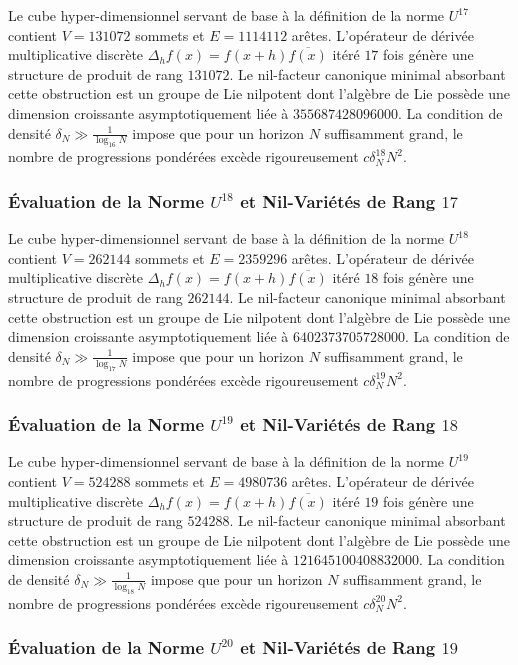 \documentclass[11pt,a4paper]{article}
\begin{document}
Le cube hyper-dimensionnel servant de base à la définition de la norme $U^{17}$ contient $V = 131072$ sommets et $E = 1114112$ arêtes. L'opérateur de dérivée multiplicative discrète $\Delta_h f(x) = f(x+h)\overline{f(x)}$ itéré $17$ fois génère une structure de produit de rang $131072$. Le nil-facteur canonique minimal absorbant cette obstruction est un groupe de Lie nilpotent dont l'algèbre de Lie possède une dimension croissante asymptotiquement liée à $355687428096000$. La condition de densité $\delta_N \gg \frac{1}{\log_{16} N}$ impose que pour un horizon $N$ suffisamment grand, le nombre de progressions pondérées excède rigoureusement $c \delta_N^{18} N^2$. \subsubsection{Évaluation de la Norme $U^{18}$ et Nil-Variétés de Rang $17$}
Le cube hyper-dimensionnel servant de base à la définition de la norme $U^{18}$ contient $V = 262144$ sommets et $E = 2359296$ arêtes. L'opérateur de dérivée multiplicative discrète $\Delta_h f(x) = f(x+h)\overline{f(x)}$ itéré $18$ fois génère une structure de produit de rang $262144$. Le nil-facteur canonique minimal absorbant cette obstruction est un groupe de Lie nilpotent dont l'algèbre de Lie possède une dimension croissante asymptotiquement liée à $6402373705728000$. La condition de densité $\delta_N \gg \frac{1}{\log_{17} N}$ impose que pour un horizon $N$ suffisamment grand, le nombre de progressions pondérées excède rigoureusement $c \delta_N^{19} N^2$. \subsubsection{Évaluation de la Norme $U^{19}$ et Nil-Variétés de Rang $18$}
Le cube hyper-dimensionnel servant de base à la définition de la norme $U^{19}$ contient $V = 524288$ sommets et $E = 4980736$ arêtes. L'opérateur de dérivée multiplicative discrète $\Delta_h f(x) = f(x+h)\overline{f(x)}$ itéré $19$ fois génère une structure de produit de rang $524288$. Le nil-facteur canonique minimal absorbant cette obstruction est un groupe de Lie nilpotent dont l'algèbre de Lie possède une dimension croissante asymptotiquement liée à $121645100408832000$. La condition de densité $\delta_N \gg \frac{1}{\log_{18} N}$ impose que pour un horizon $N$ suffisamment grand, le nombre de progressions pondérées excède rigoureusement $c \delta_N^{20} N^2$. \subsubsection{Évaluation de la Norme $U^{20}$ et Nil-Variétés de Rang $19$}
\end{document}
